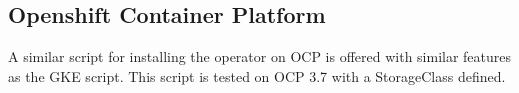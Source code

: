 \documentclass[letterpaper,12pt]{article}
\begin{document}
\subsection{Openshift Container Platform}\label{/_quickstart/_openshift_container_platform}

A similar script for installing the operator on OCP is offered with similar features as the GKE script. This script is tested on OCP 3.7 with a StorageClass defined.

\end{document}
